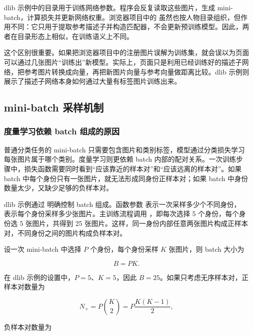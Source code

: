 dlib 示例中的目录用于训练网络参数。程序会反复读取这些图片，生成 mini-batch，计算损失并更新网络权重。浏览器项目中的  虽然也按人物目录组织，但作用不同：它只用于提取参考描述子并构造匹配器，不会更新预训练模型。因此，两者在目录形态上相似，在训练语义上不同。

这个区别很重要。如果把浏览器项目中的注册图片误解为训练集，就会误以为页面可以通过几张图片“训练出”新模型。实际上，页面只是利用已经训练好的描述子网络，把参考图片转换成向量，再把新图片向量与参考向量做距离比较。dlib 示例则展示了描述子网络本身如何通过大量有标签图片训练出来。

\subsection{mini-batch 采样机制}

\subsubsection{度量学习依赖 batch 组成的原因}

普通分类任务的 mini-batch 只需要包含图片和类别标签，模型通过分类损失学习每张图片属于哪个类别。度量学习则更依赖 batch 内部的配对关系。一次训练步骤中，损失函数需要同时看到“应该靠近的样本对”和“应该远离的样本对”。如果 batch 中每个身份只有一张图片，就无法形成同身份正样本对；如果 batch 中身份数量太少，又缺少足够的负样本对。

dlib 示例通过  明确控制 batch 组成。函数参数  表示一次采样多少个不同身份， 表示每个身份采样多少张图片。主训练流程调用 ，即每次选择 5 个身份，每个身份选 5 张图片，共得到 25 张图片。这样，同一身份内部任意两张图片构成正样本对，不同身份之间的图片构成负样本对。

设一次 mini-batch 中选择 $P$ 个身份，每个身份采样 $K$ 张图片，则 batch 大小为

\begin{equation}
  B = P K.
  \label{eq:batch_size}
\end{equation}

在 dlib 示例的设置中，$P=5$、$K=5$，因此 $B=25$。如果只考虑无序样本对，正样本对数量为

\begin{equation}
  N_{+} = P {K \choose 2} = P \frac{K(K-1)}{2},
  \label{eq:positive_pairs}
\end{equation}

负样本对数量为


